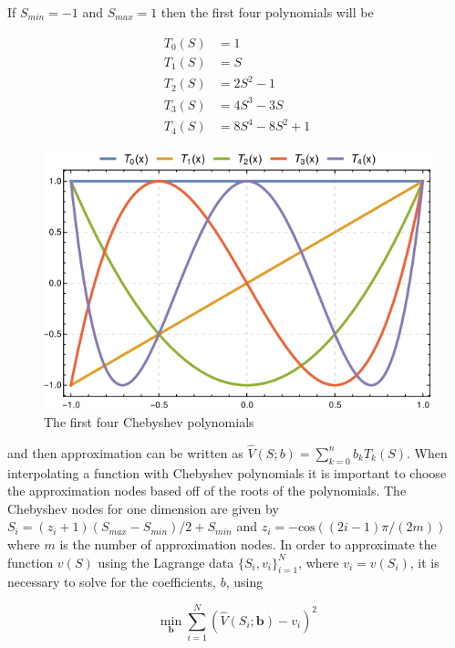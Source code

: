 \documentclass[12pt]{article}
\begin{document}
If $S_{min}=-1$ and $S_{max}=1$ then the first four polynomials will be

\begin{equation*}
  \begin{aligned}
    T_0(S)&=1\\
    T_1(S)&=S\\
    T_2(S)&=2S^2-1\\
    T_3(S)&=4S^3-3S\\
    T_4(S)&=8S^4-8S^2+1
  \end{aligned}
\end{equation*}


\begin{figure}[H]
  \label{plot_cheb_4}
  \centering
  \includegraphics[scale=3]{plot_Chebyshev_Polynomials_of_the_First_Kind}
  \caption{The first four Chebyshev polynomials}
\end{figure}

and then approximation can be written as $\hat{V}(S;b)=\sum_{k=0}^n b_k T_k(S)$.
When interpolating a function with Chebyshev polynomials it is important to choose the approximation nodes based off of the roots of the polynomials. The Chebyshev nodes for one dimension are given by $S_i=(z_i+1)(S_{max}-S_{min})/2+S_{min}$ and $z_i=-\text{cos}((2i-1)\pi/(2m))$ where $m$ is the number of approximation nodes. In order to approximate the function $v(S)$ using the Lagrange data $\{S_i,v_i\}_{i=1}^N$, where $v_i=v(S_i)$, it is necessary to solve for the coefficients, $b$, using

\begin{equation*}
  \min_{\boldsymbol{b}}\sum_{i=1}^N (\hat{V}(S_i;\boldsymbol{b})-v_i)^2
\end{equation*}
\end{document}
